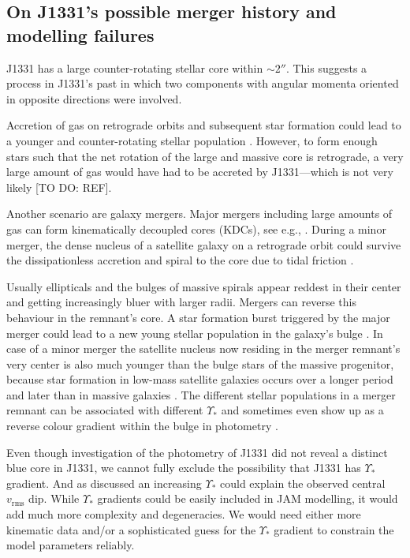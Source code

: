 \subsection{On J1331's possible merger history and modelling failures}

J1331 has a large counter-rotating stellar core within $\sim 2''$. This suggests a process in J1331's past in which two components with angular momenta oriented in opposite directions were involved.

Accretion of gas on retrograde orbits and subsequent star formation could lead to a younger and counter-rotating stellar population \Wilma{[TO DO: REF]}. However, to form enough stars such that the net rotation of the large and massive core is retrograde, a very large amount of gas would have had to be accreted by J1331---which is not very likely [TO DO: REF]. 

Another scenario are galaxy mergers. Major mergers including large amounts of gas can form kinematically decoupled cores (KDCs), see e.g., . During a minor merger, the dense nucleus of a satellite galaxy on a retrograde orbit could survive the dissipationless accretion and spiral to the core due to tidal friction \citep{1984ApJ...287..577K}. 

Usually ellipticals and the bulges of massive spirals appear reddest in their center and getting increasingly bluer with larger radii. Mergers can reverse this behaviour in the remnant's core. A star formation burst triggered by the major merger could lead to a new young stellar population in the galaxy's bulge . In case of a minor merger the satellite nucleus now residing in the merger remnant's very center is also much younger than the bulge stars of the massive progenitor, because star formation in low-mass satellite galaxies occurs over a longer period and later than in massive galaxies \Wilma{[TO DO: REF]}. The different stellar populations in a merger remnant can be associated with different $\Upsilon_*$ and sometimes even show up as a reverse colour gradient within the bulge in photometry \Wilma{[TO DO: REF]}.

Even though investigation of the photometry of J1331 did not reveal a distinct blue core in J1331, we cannot fully exclude the possibility that J1331 has $\Upsilon_*$ gradient. And as discussed \Wilma{[TO DO: Where???]} an increasing $\Upsilon_*$ could explain the observed central $v_\text{rms}$ dip. While $\Upsilon_*$ gradients could be easily included in JAM modelling, it would add much more complexity and degeneracies. We would need either more kinematic data and/or a sophisticated guess for the $\Upsilon_*$ gradient to constrain the model parameters reliably.

